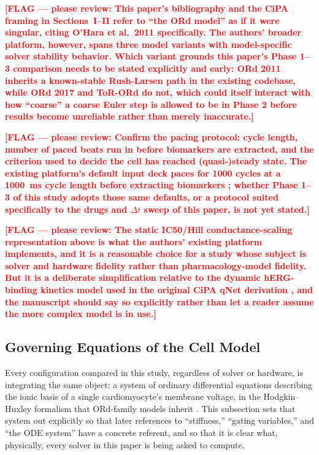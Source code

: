\documentclass[journal]{IEEEtran}
\newcommand{\flag}[1]{\textcolor{red}{\textbf{[FLAG --- please review: #1]}}}
\begin{document}
\flag{This paper's bibliography and the CiPA framing in Sections~I--II refer to ``the ORd model'' as if it were singular, citing O'Hara et al.\ 2011 \cite{ohara2011} specifically. The authors' broader platform, however, spans three model variants with model-specific solver stability behavior. Which variant grounds this paper's Phase 1--3 comparison needs to be stated explicitly and early: ORd 2011 inherits a known-stable Rush-Larsen path in the existing codebase, while ORd 2017 and ToR-ORd do not, which could itself interact with how ``coarse'' a coarse Euler step is allowed to be in Phase 2 before results become unreliable rather than merely inaccurate.}

\flag{Confirm the pacing protocol: cycle length, number of paced beats run in before biomarkers are extracted, and the criterion used to decide the cell has reached (quasi-)steady state. The existing platform's default input deck paces for 1000 cycles at a 1000~ms cycle length before extracting biomarkers \cite{pramawijaya2024thesis}; whether Phase 1--3 of this study adopts those same defaults, or a protocol suited specifically to the drugs and $\Delta t$ sweep of this paper, is not yet stated.}

\flag{The static IC50/Hill conductance-scaling representation above is what the authors' existing platform implements, and it is a reasonable choice for a study whose subject is solver and hardware fidelity rather than pharmacology-model fidelity. But it is a deliberate simplification relative to the dynamic hERG-binding kinetics model used in the original CiPA qNet derivation \cite{li2017}, and the manuscript should say so explicitly rather than let a reader assume the more complex model is in use.}

\subsection{Governing Equations of the Cell Model}
\label{sec:governing}

Every configuration compared in this study, regardless of solver or hardware, is integrating the same object: a system of ordinary differential equations describing the ionic basis of a single cardiomyocyte's membrane voltage, in the Hodgkin--Huxley formalism \cite{hodgkinhuxley1952} that ORd-family models inherit \cite{ohara2011}. This subsection sets that system out explicitly so that later references to ``stiffness,'' ``gating variables,'' and ``the ODE system'' have a concrete referent, and so that it is clear what, physically, every solver in this paper is being asked to compute.
\end{document}
